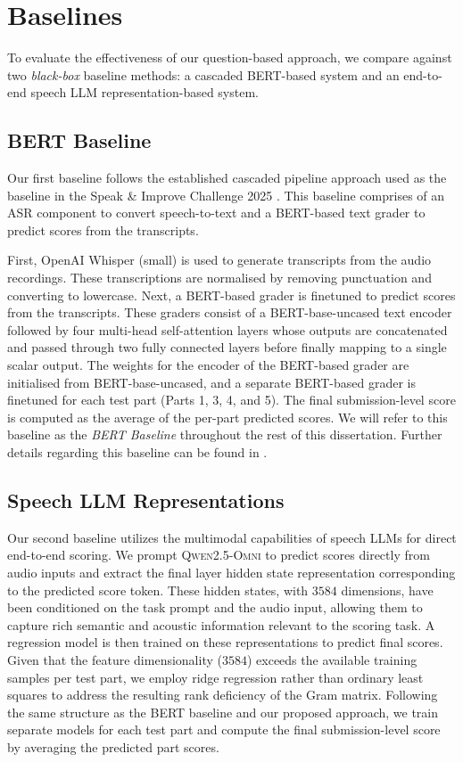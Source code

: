 \documentclass{report}
\begin{document}
\section{Baselines}
\label{sec:baselines}
To evaluate the effectiveness of our question-based approach, we compare against two \emph{black-box} baseline methods: a cascaded BERT-based system and an end-to-end speech LLM representation-based system.

\subsection{BERT Baseline}
Our first baseline follows the established cascaded pipeline approach used as the baseline in the Speak \& Improve Challenge 2025 \citep{qian2024sandi}. This baseline comprises of an ASR component to convert speech-to-text and a BERT-based text grader to predict scores from the transcripts.

First, OpenAI Whisper (small) \citep{whisper} is used to generate transcripts from the audio recordings. These transcriptions are normalised by removing punctuation and converting to lowercase. Next, a BERT-based grader is finetuned to predict scores from the transcripts. These graders consist of a BERT-base-uncased \citep{devlin2019bertpretrainingdeepbidirectional} text encoder followed by four multi-head self-attention layers whose outputs are concatenated and passed through two fully connected layers before finally mapping to a single scalar output. The weights for the encoder of the BERT-based grader are initialised from BERT-base-uncased, and a separate BERT-based grader is finetuned for each test part (Parts 1, 3, 4, and 5). The final submission-level score is computed as the average of the per-part predicted scores. We will refer to this baseline as the \emph{BERT Baseline} throughout the rest of this dissertation. Further details regarding this baseline can be found in \citet{qian2024sandi}.

\subsection{Speech LLM Representations}
Our second baseline utilizes the multimodal capabilities of speech LLMs for direct end-to-end scoring. We prompt \textsc{Qwen2.5-Omni} \citep{xu2025qwen25omnitechnicalreport} to predict scores directly from audio inputs and extract the final layer hidden state representation corresponding to the predicted score token. These hidden states, with $3584$ dimensions, have been conditioned on the task prompt and the audio input, allowing them to capture rich semantic and acoustic information relevant to the scoring task. A regression model is then trained on these representations to predict final scores. Given that the feature dimensionality ($3584$) exceeds the available training samples per test part, we employ ridge regression rather than ordinary least squares to address the resulting rank deficiency of the Gram matrix. Following the same structure as the BERT baseline and our proposed approach, we train separate models for each test part and compute the final submission-level score by averaging the predicted part scores.
\end{document}
